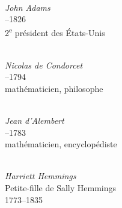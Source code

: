 \begin{minipage}[t][\textheight][s]{\textwidth}
\begin{center}
  \begin{minipage}[t]{0.33\textwidth}
    \centering
    \\
    {\figcaptionname\itshape John Adams}\\
    {--1826 \\[-5pt] 2\textsuperscript{e} président des États-Unis}
  \end{minipage}
  \hfill
  \begin{minipage}[t]{0.30\textwidth}
    \centering
    \\
    {\figcaptionname\itshape Nicolas de Condorcet}\\
    {--1794 \\[-5pt] mathématicien, philosophe}
  \end{minipage}
  \hfill
  \begin{minipage}[t]{0.33\textwidth}
    \centering
    \\
    {\figcaptionname\itshape Jean d'Alembert}\\
    {--1783 \\[-5pt] mathématicien, encyclopédiste}
  \end{minipage}

\end{center}
\vfill
\begin{center}

  \begin{minipage}[t]{0.6\textwidth}
    \centering
    \\
    {\figcaptionname\itshape Harriett Hemmings}\\
    {\figcaptiondetail Petite-fille de Sally Hemmings\\[-5pt]1773--1835}
  \end{minipage}

\end{center}
\vfill
\end{minipage}